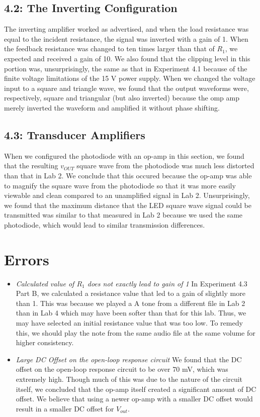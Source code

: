 \documentclass[10pt]{article}
\begin{document}
\subsection{4.2: The Inverting Configuration}
The inverting amplifier worked as advertised, and when the load resistance was equal to the incident resistance, the signal was inverted with a gain of 1. When the feedback resistance was changed to ten times larger than that of $R_1$, we expected and received a gain of 10. We also found that the clipping level in this portion was, unsurprisingly, the same as that in Experiment 4.1 because of the finite voltage limitations of the 15 V power supply. When we changed the voltage input to a square and triangle wave, we found that the output waveforms were, respectively, square and triangular (but also inverted) because the omp amp merely inverted the waveform and amplified it without phase shifting. 

\subsection{4.3: Transducer Amplifiers}
When we configured the photodiode with an op-amp in this section, we found that the resulting $v_{OUT}$ square wave from the photodiode was much less distorted than that in Lab 2. We conclude that this occured because the op-amp was able to magnify the square wave from the photodiode so that it was more easily viewable and clean compared to an unamplified signal in Lab 2. Unsurprisingly, we found that the maximum distance that the LED square wave signal could be transmitted was similar to that measured in Lab 2 because we used the same photodiode, which would lead to similar transmission differences. 

\section{Errors}
\begin{itemize}
	\item \textit{Calculated value of $R_1$ does not exactly lead to gain of 1} In Experiment 4.3 Part B, we calculated a resistance value that led to a gain of slightly more than 1. This was because we played a A tone from a different file in Lab 2 than in Lab 4 which may have been softer than that for this lab. Thus, we may have selected an initial resistance value that was too low. To remedy this, we should play the note from the same audio file at the same volume for higher consistency. 
	\item \textit{Large DC Offset on the open-loop response circuit} We found that the DC offset on the open-loop response circuit to be over 70 mV, which was extremely high. Though much of this was due to the nature of the circuit itself, we concluded that the op-amp itself created a significant amount of DC offset. We believe that using a newer op-amp with a smaller DC offset would result in a smaller DC offset for $V_{out}$. 
\end{itemize}


\medskip

\end{document}
